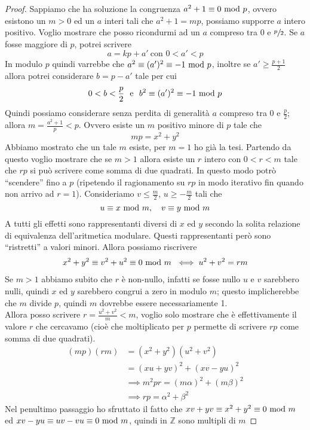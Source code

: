 \begin{proof}
	Sappiamo che ha soluzione la congruenza $a^2+1\equiv0\ \mathrm{mod}\ p$, ovvero esistono un $m>0$ ed un $a$ interi tali che $a^2+1=mp$, possiamo supporre $a$ intero positivo. Voglio mostrare che posso ricondurmi ad un $a$ compreso tra $0$ e $\sfrac{p}{2}$. Se $a$ fosse maggiore di $p$, potrei scrivere 
	\begin{equation*}
	a=kp+a' \ \text{con $0<a'<p$}
	\end{equation*}
	In modulo $p$ quindi varrebbe che $a^2\equiv(a')^2\equiv-1\ \mathrm{mod}\ p$, inoltre se $a'\geq\frac{p+1}{2}$ allora potrei considerare $b=p-a'$ tale per cui
	\begin{equation*}
	0<b<\frac{p}{2} \ \ \text{e} \ \ b^2\equiv(a')^2\equiv-1\Mod p
	\end{equation*}
	Quindi possiamo considerare senza perdita di generalità $a$ compreso tra 0 e $\frac{p}{2}$; allora $m=\frac{a^2+1}{p}<p$. Ovvero esiste un $m$ positivo minore di $p$ tale che 
	\begin{equation*}
	mp=x^2+y^2
	\end{equation*}
	Abbiamo mostrato che un tale $m$ esiste, per $m=1$ ho già la tesi. Partendo da questo voglio mostrare che se $m>1$ allora esiste un $r$ intero con $0<r<m$ tale che $rp$ si può scrivere come somma di due quadrati. In questo modo potrò \enquote{scendere} fino a $p$ (ripetendo il ragionamento su $rp$ in modo iterativo fin quando non arrivo ad $r=1$). Consideriamo $v\leq\frac{m}{2}$, $u\geq-\frac{m}{2}$ tali che 
	\begin{equation*}
	u\equiv x\ \mathrm{mod}\ m, \ \ \ v\equiv y\ \mathrm{mod}\ m
	\end{equation*}
	A tutti gli effetti sono rappresentanti diversi di $x$ ed $y$ secondo la solita relazione di equivalenza dell'aritmetica modulare. Questi rappresentanti però sono \enquote{ristretti} a valori minori.
	Allora possiamo riscrivere
	\begin{align*}
	x^2+y^2\equiv v^2+u^2 \equiv 0\ \mathrm{mod}\ m \ \iff u^2+v^2=rm
	\end{align*}
	Se $m>1$ abbiamo subito che $r$ è non-nullo, infatti se fosse nullo $u$ e $v$ sarebbero nulli, quindi $x$ ed $y$ sarebbero congrui a zero in modulo $m$; questo implicherebbe che $m$ divide $p$, quindi $m$ dovrebbe essere necessariamente 1. \\ 
	Allora posso scrivere $r=\frac{u^2+v^2}{m}<m$, voglio solo mostrare che è effettivamente il valore $r$ che cercavamo (cioè che moltiplicato per $p$ permette di scrivere $rp$ come somma di due quadrati).
	\begin{align*}
	(mp)(rm)&=(x^2+y^2)(u^2+v^2)\\
	&=(xu+yv)^2+(xv-yu)^2\\
	&\implies m^2pr=(m\alpha)^2+(m\beta)^2\\
	&\implies rp=\alpha^2+\beta^2
	\end{align*}
	Nel penultimo passaggio ho sfruttato il fatto che $xv+yv\equiv x^2+y^2\equiv0\ \mathrm{mod}\ m$ ed $xv-yu\equiv uv-vu\equiv0\ \mathrm{mod}\ m$, quindi in $\mathbb{Z}$ sono multipli di $m$
\end{proof}
